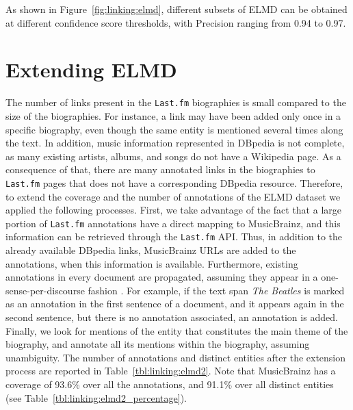 As shown in Figure~\ref{fig:linking:elmd}, different subsets of ELMD can be obtained at different confidence score thresholds, with Precision ranging from 0.94 to 0.97.

\section{Extending ELMD}
\label{sec:linking:extending}

The number of links present in the \texttt{Last.fm} biographies is small compared to the size of the biographies. For instance, a link may have been added only once in a specific biography, even though the same entity is mentioned several times along the text. 
In addition, music information represented in DBpedia is not complete, as many existing artists, albums, and songs do not have a Wikipedia page. As a consequence of that, there are many annotated links in the biographies to \texttt{Last.fm} pages that does not have a corresponding DBpedia resource.
Therefore, to extend the coverage and the number of annotations of the \textsc{ELMD} dataset we applied the following processes. First, we take advantage of the fact that a large portion of \texttt{Last.fm} annotations have a direct mapping to MusicBrainz, and this information can be retrieved through the \texttt{Last.fm} API. Thus, in addition to the already available DBpedia links, MusicBrainz URLs are added to the annotations, when this information is available. Furthermore, existing annotations in every document are propagated, assuming they appear in a one-sense-per-discourse fashion \citep{gale1992one}. For example, if the text span \textit{The Beatles} is marked as an annotation in the first sentence of a document, and it appears again in the second sentence, but there is no annotation associated, an annotation is added. Finally, we look for mentions of the entity that constitutes the main theme of the biography, and annotate all its mentions within the biography, assuming unambiguity. The number of annotations and distinct entities after the extension process are reported in Table~\ref{tbl:linking:elmd2}. Note that MusicBrainz has a coverage of 93.6\% over all the annotations, and 91.1\% over all distinct entities (see Table~\ref{tbl:linking:elmd2_percentage}).


